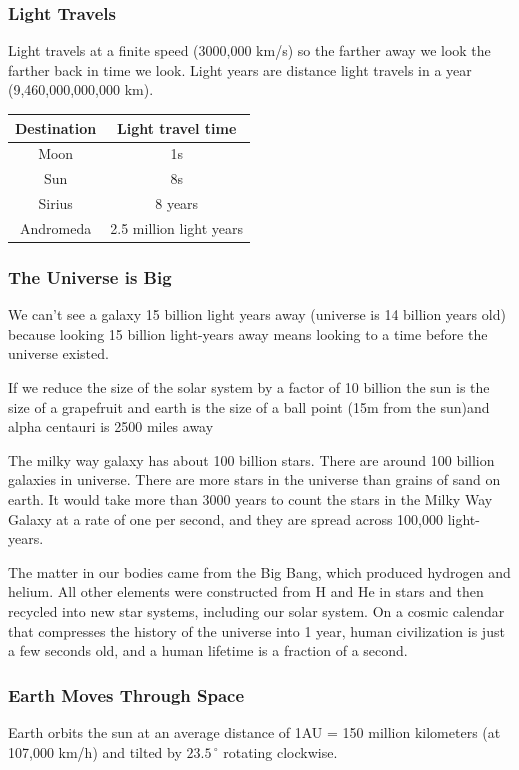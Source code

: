\documentclass[12pt]{article}
\begin{document}
\subsubsection{Light Travels}
Light travels at a finite speed (3000,000 km/s) so the farther away we look the farther back in time we look. Light years are distance light travels in a year (9,460,000,000,000 km).
\begin{center}
\begin{tabular}{|c|c|}
    \hline
    \textbf{Destination} & \textbf{Light travel time}\\
    \hline
    Moon & 1s\\
    \hline
    Sun & 8s\\
    \hline
    Sirius & 8 years\\
    Andromeda & 2.5 million light years\\
    \hline
\end{tabular}
\end{center}

\subsubsection{The Universe is Big}
We can't see a galaxy 15 billion light years away (universe is 14 billion years old) because looking 15 billion light-years away means looking to a time before the universe existed.

If we reduce the size of the solar system by a factor of 10 billion the sun is the size of a grapefruit and earth is the size of a ball point (15m from the sun)and alpha centauri is 2500 miles away

The milky way galaxy has about 100 billion stars. There are around 100 billion galaxies in universe. There are more stars in the universe than grains of sand on earth. It would take more than 3000 years to count the stars in the Milky Way Galaxy at a rate of one per second, and they are spread across 100,000 light-years.

The matter in our bodies came from the Big  Bang, which produced hydrogen and helium. All other elements were constructed from H  and He in stars and then recycled into new  star systems, including our solar system. On a cosmic calendar that compresses the history of the universe into 1 year, human civilization is just a few seconds old, and a human lifetime is a fraction of a second.

\subsubsection{Earth Moves Through Space}
Earth orbits the sun at an average distance of 1AU = 150 million kilometers (at 107,000 km/h) and tilted by $23.5\,^{\circ}$ rotating clockwise.
\end{document}
